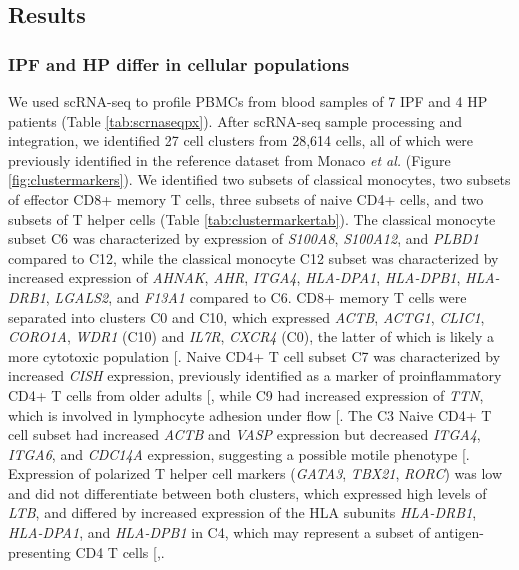 \documentclass[
]{article}
\begin{document}
\subsection{Results}\label{results-3}

\subsubsection{IPF and HP differ in cellular populations}\label{ipf-and-hp-differ-in-cellular-populations}

We used scRNA-seq to profile PBMCs from blood samples of 7 IPF and 4 HP patients (Table \ref{tab:scrnaseqpx}). After scRNA-seq sample processing and integration, we identified 27 cell clusters from 28,614 cells, all of which were previously identified in the reference dataset from Monaco \textit{et al.} (Figure \ref{fig:clustermarkers}). We identified two subsets of classical monocytes, two subsets of effector CD8+ memory T cells, three subsets of naive CD4+ cells, and two subsets of T helper cells (Table \ref{tab:clustermarkertab}). The classical monocyte subset C6 was characterized by expression of \textit{S100A8}, \textit{S100A12}, and \textit{PLBD1} compared to C12, while the classical monocyte C12 subset was characterized by increased expression of \textit{AHNAK}, \textit{AHR}, \textit{ITGA4}, \textit{HLA-DPA1}, \textit{HLA-DPB1}, \textit{HLA-DRB1}, \textit{LGALS2}, and \textit{F13A1} compared to C6. CD8+ memory T cells were separated into clusters C0 and C10, which expressed \textit{ACTB}, \textit{ACTG1}, \textit{CLIC1}, \textit{CORO1A}, \textit{WDR1} (C10) and \textit{IL7R}, \textit{CXCR4} (C0), the latter of which is likely a more cytotoxic population {[}\citeproc{ref-micevic_il-7r_2023}{160}{]}. Naive CD4+ T cell subset C7 was characterized by increased \textit{CISH} expression, previously identified as a marker of proinflammatory CD4+ T cells from older adults {[}\citeproc{ref-jin_cish_2023}{161}{]}, while C9 had increased expression of \textit{TTN}, which is involved in lymphocyte adhesion under flow {[}\citeproc{ref-toffali_isoform_2023}{162}{]}. The C3 Naive CD4+ T cell subset had increased \textit{ACTB} and \textit{VASP} expression but decreased \textit{ITGA4}, \textit{ITGA6}, and \textit{CDC14A} expression, suggesting a possible motile phenotype {[}\citeproc{ref-waldman_enavasp_2022}{163}{]}. Expression of polarized T helper cell markers (\textit{GATA3}, \textit{TBX21}, \textit{RORC}) was low and did not differentiate between both clusters, which expressed high levels of \textit{LTB}, and differed by increased expression of the HLA subunits \textit{HLA-DRB1}, \textit{HLA-DPA1}, and \textit{HLA-DPB1} in C4, which may represent a subset of antigen-presenting CD4 T cells {[},\citeproc{ref-xu_dynamic_2020}{165}{]}.
\end{document}
